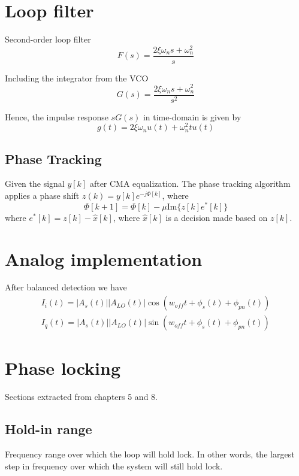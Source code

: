 \documentclass[a4paper]{article}
\begin{document}
\section{Loop filter}

Second-order loop filter
\begin{equation}
F(s) = \frac{2\xi\omega_ns + \omega_n^2}{s}
\end{equation}

Including the integrator from the VCO
\begin{equation}
G(s) = \frac{2\xi\omega_ns + \omega_n^2}{s^2}
\end{equation}

Hence, the impulse response $sG(s)$ in time-domain is given by
\begin{equation}
g(t) = 2\xi\omega_nu(t) + \omega_n^2tu(t)
\end{equation}


\subsection{Phase Tracking}
\cite{Phase1995}

Given the signal $y[k]$ after CMA equalization. The phase tracking algorithm applies a phase shift $z(k) = y[k]e^{-j\Phi[k]}$, where
\begin{equation}
\Phi[k+1] = \Phi[k]-\mu\mathrm{Im}\{z[k]e^*[k]\}
\end{equation}
where $e^*[k] = z[k] - \hat{x}[k]$, where $\hat{x}[k]$ is a decision made based on $z[k]$.

\section{Analog implementation}
After balanced detection we have
\begin{align}
I_i(t) = |A_s(t)||A_{LO}(t)|\cos(w_{off}t + \phi_s(t) + \phi_{pn}(t)) \\
I_q(t) = |A_s(t)||A_{LO}(t)|\sin(w_{off}t + \phi_s(t) + \phi_{pn}(t))
\end{align}

\section{Phase locking}
Sections extracted from \cite{Gardner} chapters 5 and 8. 

\subsection{Hold-in range}
Frequency range over which the loop will hold lock. In other words, the largest step in frequency over which the system will still hold lock.	
\end{document}
